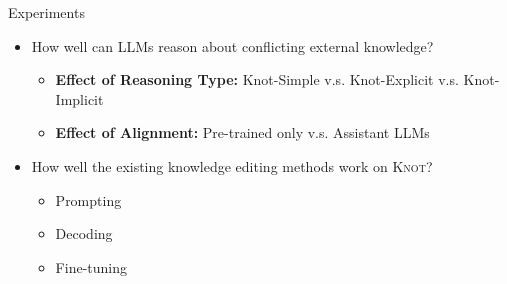 \documentclass{beamer}
\newcommand{\dataname}{\textsc{Knot}\xspace}
\begin{document}
\begin{frame}{Experiments}
    \begin{itemize}
        \item How well can LLMs reason about conflicting external knowledge?
        \begin{itemize}
            \item \textbf{Effect of Reasoning Type:} Knot-Simple v.s. Knot-Explicit v.s. Knot-Implicit
            \item \textbf{Effect of Alignment:} Pre-trained only v.s. Assistant LLMs
        \end{itemize}
        \item How well the existing knowledge editing methods work on \dataname?
        \begin{itemize}
            \item Prompting
            \item Decoding
            \item Fine-tuning
        \end{itemize}
    \end{itemize}
\end{frame}
\end{document}
